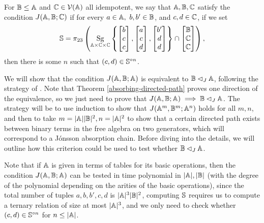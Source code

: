 \documentclass[letterpaper,11pt]{article}
\DeclareMathOperator{\Sg}{Sg}
\begin{document}
\begin{defn} For $\mathbb{B} \le \mathbb{A}$ and $\mathbb{C} \in \mathcal{V}(\mathbb{A})$ all idempotent, we say that $\mathbb{A},\mathbb{B},\mathbb{C}$ satisfy the condition $J(\mathbb{A},\mathbb{B};\mathbb{C})$ if for every $a \in \mathbb{A},\ b, b' \in \mathbb{B}$, and $c,d \in \mathbb{C}$, if we set
\[
\bS = \pi_{23}\left(\Sg_{\bA\times\bC\times\bC}\left\{\begin{bmatrix}b\\ c\\ c\end{bmatrix},\begin{bmatrix}a\\ c\\ d\end{bmatrix}, \begin{bmatrix}b'\\ d\\ d\end{bmatrix}\right\} \cap \begin{bmatrix} \bB\\ \bC\\ \bC \end{bmatrix}\right),
\]
then there is some $n$ such that $(c,d) \in \mathbb{S}^{\circ n}$.
\end{defn}

We will show that the condition $J(\mathbb{A},\mathbb{B};\mathbb{A})$ is equivalent to $\mathbb{B} \lhd_J \mathbb{A}$, following the strategy of \cite{deciding-absorption}. Note that Theorem \ref{absorbing-directed-path} proves one direction of the equivalence, so we just need to prove that $J(\mathbb{A},\mathbb{B};\mathbb{A}) \implies \mathbb{B} \lhd_J \mathbb{A}$. The strategy will be to use induction to show that $J(\mathbb{A}^m,\mathbb{B}^m;\mathbb{A}^n)$ holds for all $m,n$, and then to take $m = |\mathbb{A}||\mathbb{B}|^2, n = |\mathbb{A}|^2$ to show that a certain directed path exists between binary terms in the free algebra on two generators, which will correspond to a J\'onsson absorption chain. Before diving into the details, we will outline how this criterion could be used to test whether $\mathbb{B} \lhd_J \mathbb{A}$.

Note that if $\mathbb{A}$ is given in terms of tables for its basic operations, then the condition $J(\mathbb{A},\mathbb{B};\mathbb{A})$ can be tested in time polynomial in $|\mathbb{A}|, |\mathbb{B}|$ (with the degree of the polynomial depending on the arities of the basic operations), since the total number of tuples $a,b,b',c,d$ is $|\mathbb{A}|^3|\mathbb{B}|^2$, computing $\mathbb{S}$ requires us to compute a ternary relation of size at most $|\mathbb{A}|^3$, and we only need to check whether $(c,d) \in \mathbb{S}^{\circ n}$ for $n \le |\mathbb{A}|$.
\end{document}
